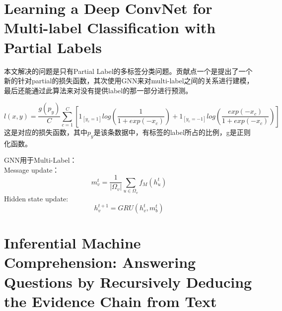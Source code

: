 \documentclass[a4paper,UTF8]{article}
\numberwithin{equation}{section}
\begin{document}
\newpage
\section{Learning a Deep ConvNet for Multi-label Classification with Partial Labels}
本文解决的问题是只有Partial Label的多标签分类问题。贡献点一个是提出了一个新的针对partial的损失函数，其次使用GNN来对multi-label之间的关系进行建模，最后还能通过此算法来对没有提供label的那一部分进行预测。

$$l(x,y)=\frac{g(p_y)}{C} \sum_{c=1}^{C}[1_{[y_c =1 ]}log(\frac{1}{1+exp(-x_c)})+1_{[y_c =-1 ]}log(\frac{exp(-x_c)}{1+exp(-x_c)})] $$
这是对应的损失函数，其中$p_y$是该条数据中，有标签的label所占的比例，g是正则化函数。

GNN用于Multi-Label：\\
Message update：\\
$$m_v^t = \frac{1}{|\Omega_v|}\sum_{u \in \Omega_v}f_{M}(h_u^t)$$
Hidden state update:\\
$$ h_v^{t+1}=GRU(h_v^t,m_b^t) $$


\newpage
\section{Inferential Machine Comprehension: Answering Questions by Recursively Deducing the Evidence Chain from Text}
\end{document}
